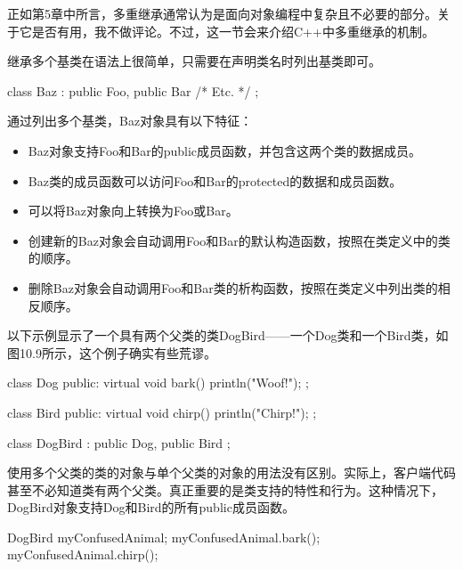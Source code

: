 
正如第5章中所言，多重继承通常认为是面向对象编程中复杂且不必要的部分。关于它是否有用，我不做评论。不过，这一节会来介绍C++中多重继承的机制。


继承多个基类在语法上很简单，只需要在声明类名时列出基类即可。

\begin{cpp}
class Baz : public Foo, public Bar { /* Etc. */ };
\end{cpp}

通过列出多个基类，Baz对象具有以下特征：

\begin{itemize}
\item
Baz对象支持Foo和Bar的public成员函数，并包含这两个类的数据成员。

\item
Baz类的成员函数可以访问Foo和Bar的protected的数据和成员函数。

\item
可以将Baz对象向上转换为Foo或Bar。

\item
创建新的Baz对象会自动调用Foo和Bar的默认构造函数，按照在类定义中的类的顺序。

\item
删除Baz对象会自动调用Foo和Bar类的析构函数，按照在类定义中列出类的相反顺序。
\end{itemize}

以下示例显示了一个具有两个父类的类DogBird——一个Dog类和一个Bird类，如图10.9所示，这个例子确实有些荒谬。


\begin{cpp}
class Dog
{
    public:
        virtual void bark() { println("Woof!"); }
};

class Bird
{
    public:
        virtual void chirp() { println("Chirp!"); }
};

class DogBird : public Dog, public Bird
{
};
\end{cpp}

使用多个父类的类的对象与单个父类的对象的用法没有区别。实际上，客户端代码甚至不必知道类有两个父类。真正重要的是类支持的特性和行为。这种情况下，DogBird对象支持Dog和Bird的所有public成员函数。

\begin{cpp}
DogBird myConfusedAnimal;
myConfusedAnimal.bark();
myConfusedAnimal.chirp();
\end{cpp}


